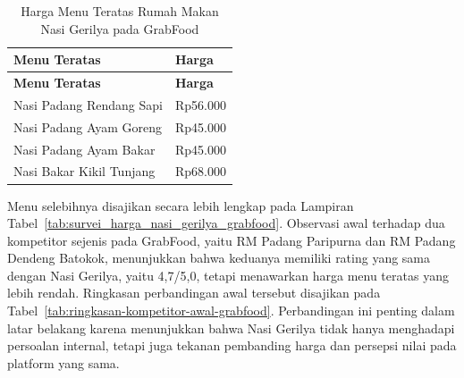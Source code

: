 \begingroup
    \small
    \begin{xltabular}{\textwidth}{|Y|R{3.0cm}|}
        \caption{Harga Menu Teratas Rumah Makan Nasi Gerilya pada GrabFood}
        \label{tab:harga-menu-teratas-gerilya}\\
        \toprule
        \textbf{Menu Teratas}    & \textbf{Harga} \\ \hline
        \midrule
        \endfirsthead
        \toprule
        \textbf{Menu Teratas}    & \textbf{Harga} \\ \hline
        \midrule
        \endhead
        \endfoot
        \bottomrule
        \endlastfoot
        Nasi Padang Rendang Sapi & Rp56.000       \\ \hline
        Nasi Padang Ayam Goreng  & Rp45.000       \\ \hline
        Nasi Padang Ayam Bakar   & Rp45.000       \\ \hline
        Nasi Bakar Kikil Tunjang & Rp68.000       \\ \hline
    \end{xltabular}
\endgroup

Menu selebihnya disajikan secara lebih lengkap pada Lampiran Tabel~\ref{tab:survei_harga_nasi_gerilya_grabfood}. Observasi awal terhadap dua kompetitor sejenis pada GrabFood, yaitu RM Padang Paripurna dan RM Padang Dendeng Batokok, menunjukkan bahwa keduanya memiliki rating yang sama dengan Nasi Gerilya, yaitu 4,7/5,0, tetapi menawarkan harga menu teratas yang lebih rendah. Ringkasan perbandingan awal tersebut disajikan pada Tabel~\ref{tab:ringkasan-kompetitor-awal-grabfood}. Perbandingan ini penting dalam latar belakang karena menunjukkan bahwa Nasi Gerilya tidak hanya menghadapi persoalan internal, tetapi juga tekanan pembanding harga dan persepsi nilai pada platform yang sama.

